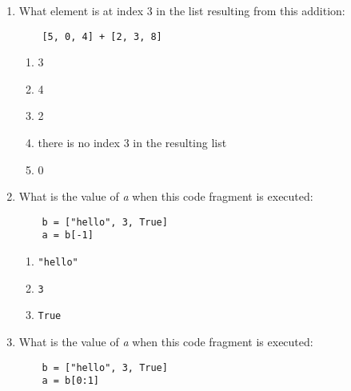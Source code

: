 \documentclass[10pt]{article}
\begin{document}
\begin{enumerate}
\begin{enumerate}
\item
an error, the lists are not the same size
\item
{\codesize\verb![4, 3, 2, 1, 0]!}
\item
{\codesize\verb![0, 1, 2, 3, 4]!}
\item
{\codesize\verb![4, 2, 0, 3, 1]!}
\end{enumerate}
\item
What element is at index 3 in the list resulting from this addition: 
\color{CodeGreen}
\begin{codesize}
\begin{verbatim}
    [5, 0, 4] + [2, 3, 8]
\end{verbatim}
\end{codesize}
\color{black}

\begin{enumerate}
\item
3
\item
4
\item
2
\item
there is no index 3 in the resulting list
\item
0
\end{enumerate}
\item
What is the value of {\it a} when this code fragment is executed: 
\color{CodeGreen}
\begin{codesize}
\begin{verbatim}
    b = ["hello", 3, True]
    a = b[-1]
\end{verbatim}
\end{codesize}
\color{black}

\begin{enumerate}
\item
{\codesize\verb!"hello"!}
\item
{\codesize\verb!3!}
\item
{\codesize\verb!True!}
\end{enumerate}
\item
What is the value of {\it a} when this code fragment is executed: 
\color{CodeGreen}
\begin{codesize}
\begin{verbatim}
    b = ["hello", 3, True]
    a = b[0:1]
\end{verbatim}
\end{codesize}
\color{black}


\end{enumerate}
\end{document}
